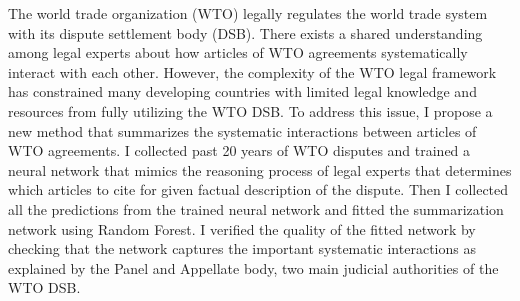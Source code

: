 The world trade organization (WTO) legally regulates the world trade system with its dispute settlement body (DSB).
There exists a shared understanding among legal experts about how articles of WTO agreements systematically interact with each other. 
However, the complexity of the WTO legal framework has constrained many developing countries with limited legal knowledge and resources from fully utilizing the WTO DSB.
To address this issue, I propose a new method that summarizes the systematic interactions between articles of WTO agreements.
I collected past 20 years of WTO disputes and trained a neural network that mimics the reasoning process of legal experts that determines which articles to cite for given factual description of the dispute.
Then I collected all the predictions from the trained neural network and fitted the summarization network using Random Forest.
I verified the quality of the fitted network by checking that the network captures the important systematic interactions as explained by the Panel and Appellate body, two main judicial authorities of the WTO DSB.  %

